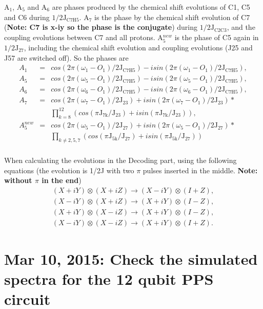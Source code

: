 \documentclass[prl,onecolumn]{revtex4-1}
\newcommand{\bea}{\begin{eqnarray}}
\newcommand{\eea}{\end{eqnarray}}
\begin{document}
A$_1$, A$_5$ and A$_6$ are phases produced by the chemical shift evolutions of C1, C5 and C6 during $1/2\text{J}_{\text{C7H5}}$. A$_7$ is the phase by the chemical shift evolution of C7 (\textbf{Note: C7 is x-iy so the phase is the conjugate}) during $1/2\text{J}_{\text{C2C3}}$, and the coupling evolutions between C7 and all protons. A$_5^{new}$ is the phase of C5 again in $1/2\text{J}_{\text{27}}$, including the chemical shift evolution and coupling evolutions (J25 and J57 are switched off). So the phases are
\bea
A_1 & = &cos(2\pi(\omega_1-O_1)/2\text{J}_{\text{C7H5}})-isin(2\pi(\omega_1-O_1)/2\text{J}_{\text{C7H5}}), \\ \nonumber
A_5 & = &cos(2\pi(\omega_5-O_1)/2\text{J}_{\text{C7H5}})-isin(2\pi(\omega_5-O_1)/2\text{J}_{\text{C7H5}}), \\ \nonumber
A_6 & = &cos(2\pi(\omega_6-O_1)/2\text{J}_{\text{C7H5}})-isin(2\pi(\omega_6-O_1)/2\text{J}_{\text{C7H5}}), \\ \nonumber
A_7 & = &cos(2\pi(\omega_7-O_1)/2\text{J}_{\text{23}})+isin(2\pi(\omega_7-O_1)/2\text{J}_{\text{23}})* \\ \nonumber
&& \prod_{k=8}^{12} (cos(\pi\text{J}_{\text{7k}}/\text{J}_{\text{23}})+isin(\pi\text{J}_{\text{7k}}/\text{J}_{\text{23}})), \\ \nonumber
A_5^{new} & = &cos(2\pi(\omega_5-O_1)/2\text{J}_{\text{27}})+isin(2\pi(\omega_5-O_1)/2\text{J}_{\text{27}})* \\ \nonumber
&& \prod_{k\neq 2, 5, 7} (cos(\pi\text{J}_{\text{5k}}/\text{J}_{\text{27}})+isin(\pi\text{J}_{\text{5k}}/\text{J}_{\text{27}})) \\ \nonumber
\eea

When calculating the evolutions in the Decoding part, using the following equations (the evolution is 1/2J with two $\pi$ pulses inserted in the middle. \textbf{Note: without $\pi$ in the end})
\bea
(X+iY)\otimes(X+iZ) \longrightarrow (X-iY)\otimes(I+Z), \\ \nonumber
(X-iY)\otimes(X+iZ) \longrightarrow (X+iY)\otimes(I-Z), \\ \nonumber
(X+iY)\otimes(X-iZ) \longrightarrow (X+iY)\otimes(I-Z), \\ \nonumber
(X-iY)\otimes(X-iZ) \longrightarrow (X+iY)\otimes(I+Z).
\eea

\newpage
\section{Mar 10, 2015: Check the simulated spectra for the 12 qubit PPS circuit}
\end{document}
